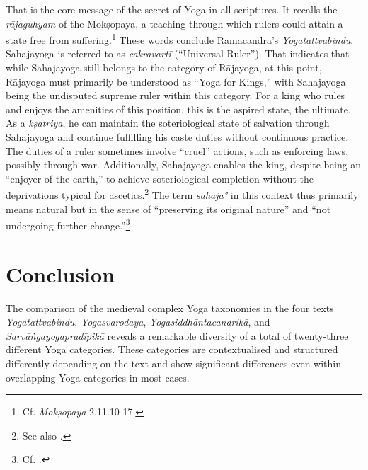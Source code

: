 That is the core message of the secret of Yoga in all scriptures. It recalls the \textit{rājaguhyam} of the Mokṣopaya, a teaching through which rulers could attain a state free from suffering.\footnote{Cf. \emph{Mokṣopaya} 2.11.10-17.\nocite{moskopaya12}} These words conclude Rāmacandra's \emph{Yogatattvabindu}. Sahajayoga is referred to as \textit{cakravartī} (``Universal Ruler''). That indicates that while Sahajayoga still belongs to the category of Rājayoga, at this point, Rājayoga must primarily be understood as ``Yoga for Kings,'' with Sahajayoga being the undisputed supreme ruler within this category. For a king who rules and enjoys the amenities of this position, this is the aspired state, the ultimate. As a \textit{kṣatriya}, he can maintain the soteriological state of salvation through Sahajayoga and continue fulfilling his caste duties without continuous practice. The duties of a ruler sometimes involve ``cruel'' actions, such as enforcing laws, possibly through war. Additionally, Sahajayoga enables the king, despite being an ``enjoyer of the earth,'' to achieve soteriological completion without the deprivations typical for ascetics.\footnote{See also \citeauthor[2006: 121]{hanneder2006}.} The term \textit{sahaja°} in this context thus primarily means natural but in the sense of ``preserving its original nature'' and ``not undergoing further change.''\footnote{Cf. .}

\section{Conclusion}
\label{comparisonconclusion}
The comparison of the medieval complex Yoga taxonomies in the four texts \textit{Yogatattvabindu}, \textit{Yogasvarodaya}, \textit{Yogasiddhāntacandrikā}, and \textit{Sarvāṅgayogapradīpikā} reveals a remarkable diversity of a total of twenty-three different Yoga categories. These categories are contextualised and structured differently depending on the text and show significant differences even within overlapping Yoga categories in most cases.

